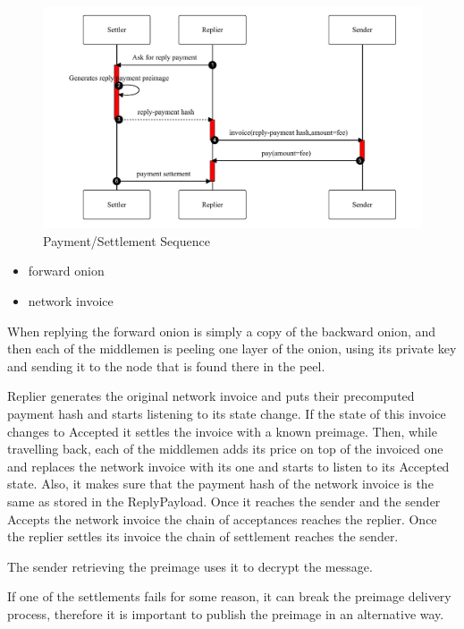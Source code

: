 \documentclass{article}
\begin{document}
\begin{figure}
	\centering
	\includegraphics[scale=0.8]{PayForService.pdf}
	\caption{Payment/Settlement Sequence}
	\label{fig:payforservice}
\end{figure}

\begin{itemize}
	\item  forward onion
	\item  network invoice
\end{itemize}

When replying the forward onion is simply a copy of the backward onion, and then each of the middlemen is peeling one layer of the onion, using its private key and sending it to the node that is found there in the peel.

Replier generates the original network invoice and puts their precomputed payment hash and starts listening to its state change. If the state of this invoice changes to Accepted it settles the invoice with a known preimage.
Then, while travelling back, each of the middlemen adds its price on top of the invoiced one and replaces the network invoice with its one and starts to listen to its Accepted state. Also, it makes sure that the payment hash of the network invoice is the same as stored in the ReplyPayload.
Once it reaches the sender and the sender Accepts the network invoice the chain of acceptances reaches the replier. Once the replier settles its invoice the chain of settlement reaches the sender.

The sender retrieving the preimage uses it to decrypt the message.

If one of the settlements fails for some reason, it can break the preimage delivery process, therefore it is important to publish the preimage in an alternative way.
\end{document}
